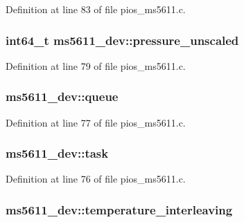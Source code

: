 Definition at line 83 of file pios\-\_\-ms5611.\-c.

\hypertarget{structms5611__dev_a06bd507d0e8ff5e0cb6ac32bea05061c}{
\subsubsection[{pressure\-\_\-unscaled}]{\setlength{\rightskip}{0pt plus 5cm}int64\-\_\-t ms5611\-\_\-dev\-::pressure\-\_\-unscaled}}\label{structms5611__dev_a06bd507d0e8ff5e0cb6ac32bea05061c}


Definition at line 79 of file pios\-\_\-ms5611.\-c.

\hypertarget{structms5611__dev_a72daf619c834a91f065403ba600b79d5}{
\subsubsection[{queue}]{ ms5611\-\_\-dev\-::queue}}\label{structms5611__dev_a72daf619c834a91f065403ba600b79d5}


Definition at line 77 of file pios\-\_\-ms5611.\-c.

\hypertarget{structms5611__dev_a1c3007a7e12067eb6c4b2e42d0991f69}{
\subsubsection[{task}]{ ms5611\-\_\-dev\-::task}}\label{structms5611__dev_a1c3007a7e12067eb6c4b2e42d0991f69}


Definition at line 76 of file pios\-\_\-ms5611.\-c.

\hypertarget{structms5611__dev_afc179b4b564d92758f6ae8028f900a0d}{
\subsubsection[{temperature\-\_\-interleaving}]{ ms5611\-\_\-dev\-::temperature\-\_\-interleaving}}\label{structms5611__dev_afc179b4b564d92758f6ae8028f900a0d}


